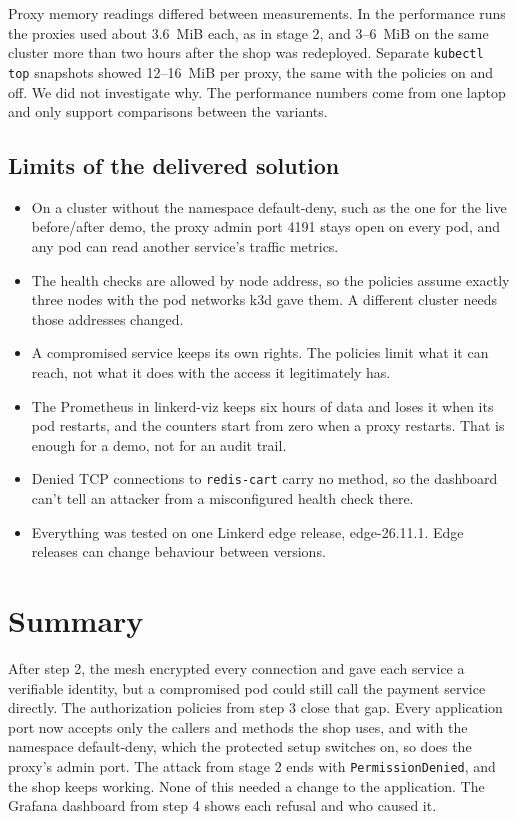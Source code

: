 \documentclass[12pt,a4paper]{article}
\begin{document}
Proxy memory readings differed between measurements. In the performance runs
the proxies used about 3.6~MiB each, as in stage 2, and 3--6~MiB on the same
cluster more than two hours after the shop was redeployed. Separate
\texttt{kubectl top} snapshots showed 12--16~MiB per proxy, the same with the
policies on and off. We did not investigate why. The performance numbers come
from one laptop and only support comparisons between the variants.

\subsection*{Limits of the delivered solution}

\begin{itemize}[itemsep=2pt]
  \item On a cluster without the namespace default-deny, such as the one for
    the live before/after demo, the proxy admin port 4191 stays open on
    every pod, and any pod can read another service's traffic metrics.
  \item The health checks are allowed by node address, so the policies assume
    exactly three nodes with the pod networks k3d gave them. A different
    cluster needs those addresses changed.
  \item A compromised service keeps its own rights. The policies limit what
    it can reach, not what it does with the access it legitimately has.
  \item The Prometheus in linkerd-viz keeps six hours of data and loses it
    when its pod restarts, and the counters start from zero when a proxy
    restarts. That is enough for a demo, not for an audit trail.
  \item Denied TCP connections to \texttt{redis-cart} carry no method, so the
    dashboard can't tell an attacker from a misconfigured health check there.
  \item Everything was tested on one Linkerd edge release, edge-26.11.1. Edge
    releases can change behaviour between versions.
\end{itemize}

\section{Summary}

After step 2, the mesh encrypted every connection and gave each service a
verifiable identity, but a compromised pod could still call the payment
service directly. The authorization policies from step 3 close that gap.
Every application port now accepts only the callers and methods the shop
uses, and with the namespace default-deny, which the protected setup switches
on, so does the proxy's admin port. The attack from stage 2 ends with \texttt{PermissionDenied}, and the
shop keeps working. None of this needed a change to the application. The Grafana
dashboard from step 4 shows each refusal and who caused it.
\end{document}
